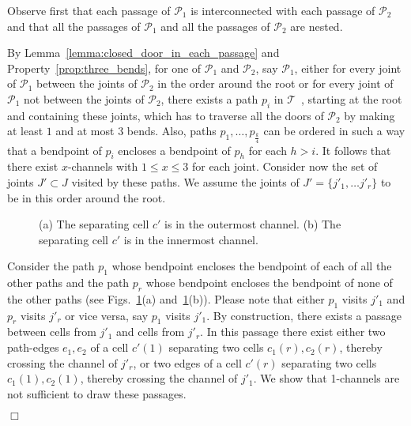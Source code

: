 \documentclass[a4paper,10pt]{llncs}
\newcounter{prop}
\renewenvironment{proof}
{{\bf Proof:}}{\hspace*{\fill}$\Box$\par\vspace{2mm}}
\newcommand{\T}{\mbox{$\mathcal T$ }}
\begin{document}
\begin{proof}
Observe first that each passage of ${\mathcal P}_1$ is interconnected with each passage of ${\mathcal P}_2$ and that all the passages of ${\mathcal P}_1$ and all the passages of ${\mathcal P}_2$ are nested.

By Lemma~\ref{lemma:closed_door_in_each_passage} and Property~\ref{prop:three_bends}, for one of ${\mathcal P}_1$ and ${\mathcal P}_2$, say ${\mathcal P}_1$, either for every joint of ${\mathcal P}_1$ between the joints of ${\mathcal P}_2$ in the order around the root or for every joint of ${\mathcal P}_1$ not between the joints of ${\mathcal P}_2$, there exists a path $p_i$ in \T, starting at the root and containing these joints, which has to traverse all the doors of ${\mathcal P}_2$ by making at least $1$ and at most $3$ bends. Also, paths $p_1,\ldots , p_{\frac{k}{4}}$ can be ordered in such a way that a bendpoint of $p_i$ encloses a bendpoint of $p_h$ for each $h>i$.
It follows that there exist $x$-channels with $1\leq x \leq 3$ for each joint.
Consider now the set of joints $J'\subset J$ visited by these paths.
We assume the joints of $J'=\{j'_1,\ldots j'_r \}$ to be in this order around the root.

\begin{figure}[htb]
\caption{(a) The separating cell $c'$ is in the outermost channel. (b) The separating cell $c'$ is in the innermost channel.}
  \label{fig:lemma5-cases}
\end{figure}

Consider the path $p_1$ whose bendpoint encloses the bendpoint of each of all the other paths and the path $p_r$ whose bendpoint encloses the bendpoint of none of the other paths (see Figs.~\ref{fig:lemma5-cases}(a) and~\ref{fig:lemma5-cases}(b)).
Please note that either $p_1$ visits $j'_1$ and $p_r$ visits $j'_r$ or vice versa, say $p_1$ visits $j'_1$.
By construction, there exists a passage between cells from $j'_1$ and cells from $j'_r$. In this passage there exist either two path-edges $e_1, e_2$ of a cell $c'(1)$ separating two cells $c_1(r),c_2(r)$, thereby crossing the channel of $j'_r$, or two edges of a cell $c'(r)$ separating two cells $c_1(1),c_2(1)$, thereby crossing the channel of $j'_1$. We show that 1-channels are not sufficient to draw these passages.


\end{proof}
\end{document}

